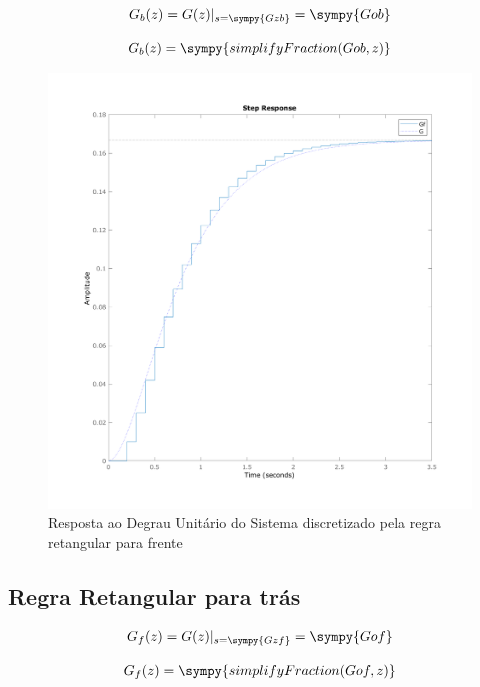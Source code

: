 \documentclass[a4paper,11pt]{article}
\begin{document}
$$
G_b(z) =  G(z)|_{s = \sympy{Gzb}} = \sympy{Gob}
$$

\begin{equation}
    G_b(z) = \sympy{simplifyFraction(Gob,z)}
\end{equation}

\begin{figure}[H]
    \centering
    \includegraphics[width=0.8\linewidth]{img/exsim2-plot-g-forward.png}
    \caption{Resposta ao Degrau Unitário do Sistema discretizado pela regra retangular para frente}
\end{figure}

\subsection{Regra Retangular para trás}

$$
G_f(z) =  G(z)|_{s = \sympy{Gzf}} = \sympy{Gof}
$$

\begin{equation}
    G_f(z) = \sympy{simplifyFraction(Gof,z)}
\end{equation}
\end{document}
